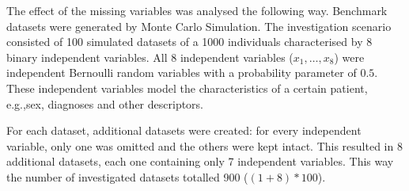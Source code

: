 										
									
		The effect of the missing variables was analysed the following way. Benchmark datasets were generated by Monte Carlo Simulation. The investigation scenario consisted of 100 simulated datasets of a 1000 individuals characterised by 8 binary independent variables. All 8 independent variables ($x_1,\dots,x_8$) were independent Bernoulli random variables with a probability parameter of $0.5$. These independent variables model the characteristics of a certain patient, e.g.,sex, diagnoses and other descriptors.
										
		For each dataset, additional datasets were created: for every independent variable, only one was omitted and the others were kept intact. This resulted in 8 additional datasets, each one containing only 7 independent variables. This way the number of investigated datasets totalled 900 ($(1+8)*100$).
		
										
